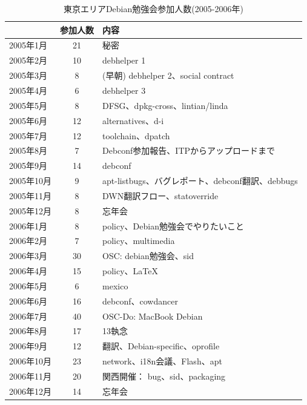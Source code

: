 \documentclass[mingoth,a4paper]{jsarticle}
\begin{document}
\begin{table}[h]
\begin{minipage}{0.5\hsize}
 \caption{東京エリアDebian勉強会参加人数(2005-2006年)}\label{tab:count}
 \begin{center}
  \begin{tabular}{|l|c|p{10em}|}
 \hline
   & 参加人数 & 内容 \\
 \hline
   2005年1月 & 21 & 秘密\\
   2005年2月 & 10 & debhelper 1\\
   2005年3月 & 8 &  (早朝) debhelper 2、social contract\\
   2005年4月 & 6 & debhelper 3\\
   2005年5月 & 8 & DFSG、dpkg-cross、lintian/linda\\
   2005年6月 & 12 & alternatives、d-i\\
   2005年7月 & 12 & toolchain、dpatch\\
   2005年8月 & 7 & Debconf参加報告、ITPからアップロードまで\\
   2005年9月 & 14 & debconf\\
   2005年10月 & 9 & apt-listbugs、バグレポート、debconf翻訳、debbugs\\
   2005年11月 & 8 & DWN翻訳フロー、statoverride\\
   2005年12月 & 8 & 忘年会\\
   2006年1月 & 8 & policy、Debian勉強会でやりたいこと\\
   2006年2月 & 7 & policy、multimedia \\
   2006年3月 & 30 & OSC: debian勉強会、sid \\
   2006年4月 & 15 & policy、\LaTeX{} \\
   2006年5月 & 6 & mexico \\
   2006年6月 & 16 & debconf、cowdancer\\
   2006年7月 & 40 & OSC-Do: MacBook Debian \\
   2006年8月 & 17 & 13執念 \\
   2006年9月 & 12 & 翻訳、Debian-specific、oprofile \\
   2006年10月 & 23 & network、i18n会議、Flash、apt \\
   2006年11月 & 20 & 関西開催： bug、sid、packaging \\
   2006年12月 & 14 & 忘年会 \\
 \hline
  \end{tabular}
 \end{center}
\end{minipage}
\begin{minipage}{0.5\hsize}

\end{minipage}
\end{table}
\end{document}
